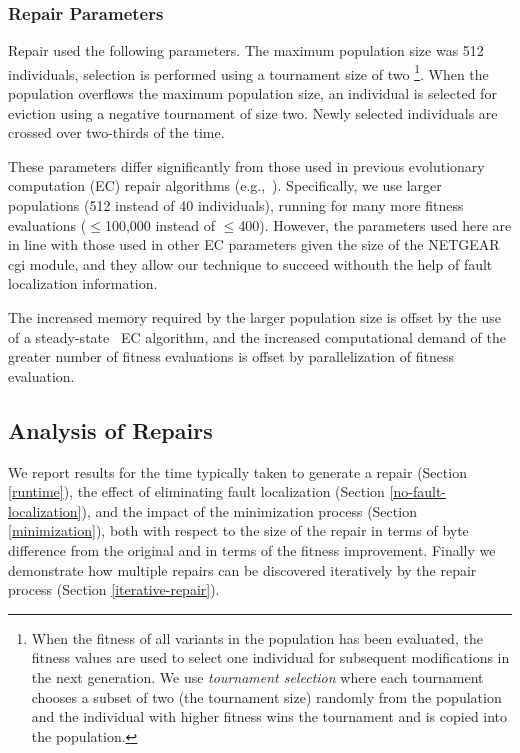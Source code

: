 \documentclass{sigcomm-alternate}
\begin{document}
\subsubsection{Repair Parameters}
\label{sec:parameters}
Repair used the following parameters.  The maximum population size was
512 individuals, selection is performed using a tournament size of two
\footnote{When the fitness of all variants in the population has been
  evaluated, the fitness values are used to select one individual for
  subsequent modifications in the next generation.  We use
  \emph{tournament selection} where each tournament chooses a subset
  of two (the tournament size) randomly from the population and the
  individual with higher fitness wins the tournament and is copied
  into the population.}.  When the population overflows the maximum
population size, an individual is selected for eviction using a
negative tournament of size two.  Newly selected individuals are
crossed over two-thirds of the time.

These parameters differ significantly from those used in previous
evolutionary computation (EC)
repair algorithms
(e.g.,~\cite{forrest2009genetic,legoues2011systematicstudy,le2012representations}).
Specifically, we use larger populations (512 instead of 40 individuals),
running for many more fitness evaluations ($\leq$100,000 instead of
$\leq$400).  However, the parameters used here are in line with
those used in other EC parameters given the size of the NETGEAR cgi
module, and they
allow our technique to succeed withouth the help of fault localization
information.

The increased memory required by the larger population size is offset
by the use of a steady-state~\cite{Luke2013Metaheuristics} EC
algorithm, and the increased computational demand of the greater
number of fitness evaluations is offset by parallelization of fitness
evaluation.

\subsection{Analysis of Repairs}
\label{analysis}

We report results for the time typically taken to generate a repair
(Section \ref{runtime}), the effect of eliminating fault localization
(Section \ref{no-fault-localization}), and the impact of the
minimization process (Section \ref{minimization}), both with respect
to the size of the repair in terms of byte difference from the
original and in terms of the fitness improvement.  Finally we
demonstrate how multiple repairs can be discovered iteratively by the
repair process (Section \ref{iterative-repair}).
\end{document}
